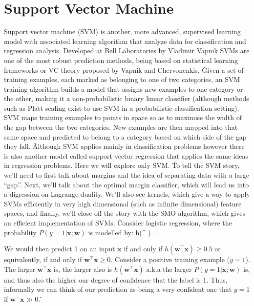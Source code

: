 \section{Support Vector Machine}

Support vector machine (SVM) is another, more advanced, supervised learning model with associated learning algorithm
that analyze data for classification and regression analysis. Developed at Bell Laboratories by Vladimir Vapnik SVMs
are one of the most robust prediction methods, being based on statistical learning frameworks or VC theory proposed
by Vapnik and Chervonenkis. \v

Given a set of training examples, each marked as belonging to one of two categories, an SVM training algorithm builds
a model that assigns new examples to one category or the other, making it a non-probabilistic binary linear
classifier (although methods such as Platt scaling exist to use SVM in a probabilistic classification setting). SVM
maps training examples to points in space so as to maximise the width of the gap between the two categories. New
examples are then mapped into that same space and predicted to belong to a category based on which side of the gap
they fall. \v

Although SVM applies mainly in classification problems however there is also another model called support vector
regression that applies the same ideas in regression problems. Here we will explore only SVM. \v

To tell the SVM story, we'll need to first talk about margins and the idea of separating data with a large ``gap''.
Next, we'll talk about the optimal margin classifier, which will lead us into a digression on Lagrange duality. We'll
also see kernels, which give a way to apply SVMs efficiently in very high dimensional (such as infinite dimensional)
feature spaces, and finally, we'll close off the story with the SMO algorithm, which gives an efficient
implementation of SVMs. \v

Consider logistic regression, where the probability $P(y = 1| \boldsymbol{x}; \boldsymbol{w})$ is modelled by:
\bse
h(^{\intercal} ) = 
\ese

We would then predict 1 on an input $\boldsymbol{x}$ if and only if $h \left(\boldsymbol{w}^{\intercal} \boldsymbol{x}\right)
\geq 0.5$ or equivalently, if and only if $\boldsymbol{w}^{\intercal} \boldsymbol{x} \geq 0$. Consider a positive
training example ($y = 1$). The larger $\boldsymbol{w}^{\intercal} \boldsymbol{x}$ is, the larger also is $h
\left(\boldsymbol{w}^{\intercal} \boldsymbol{x}\right)$ a.k.a the larger $P(y = 1| \boldsymbol{x}; \boldsymbol{w})$ is, and thus
also the higher our degree of confidence that the label is 1. Thus, informally we can think of our prediction as
being a very confident one that $y = 1$ if $\boldsymbol{w}^{\intercal} \boldsymbol{x} \gg 0$. \v

